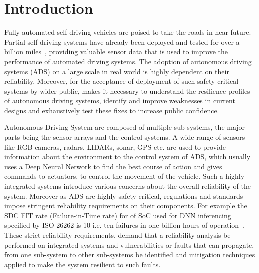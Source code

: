 \section{Introduction}

Fully automated self driving vehicles are poised to take the roads in near future. Partial self driving systems have already been deployed and tested for over a billion miles~\cite{teslasr},  providing valuable sensor data that is used to improve the performance of automated driving systems. The adoption of autonomous driving systems (ADS) on a large scale in real world is highly dependent on their reliability. Moreover, for the acceptance of deployment of such safety critical systems by wider public, makes it necessary to understand the resilience profiles of autonomous driving systems, identify and improve weaknesses in current designs and exhaustively test these fixes to increase public confidence.

 
Autonomous Driving System are composed of multiple sub-systems, the major parts being the sensor arrays and the control systems. A wide range of sensors like RGB cameras, radars, LIDARs, sonar, GPS etc. are used to provide information about the environment to the control system of ADS, which usually uses a Deep Neural Network to find the best course of action and gives commands to actuators, to control the movement of the vehicle. Such a highly integrated systems introduce various concerns about the overall reliability of the system. Moreover as ADS are highly safety critical, regulations and standards impose stringent reliability requirements on their components. For example the SDC FIT rate (Failure-in-Time rate) for of SoC used for DNN inferencing specified by ISO-26262 is 10 i.e. ten failures in one billion hours of operation~\cite{guanpeng17sc}. These strict reliability requirements, demand that a reliability analysis be performed on integrated systems and vulnerabilities or faults that can propagate, from one sub-system to other sub-systems be identified and mitigation techniques applied to make the system resilient to such faults.

